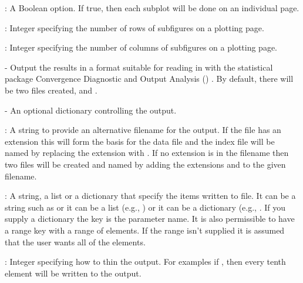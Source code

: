 \documentclass[article]{jss}
\begin{document}
\begin{description}
\begin{description}
\begin{description}
\begin{description}
    \item {}: A Boolean option. If true, then each
      subplot will be done on an individual page.
    \item {}: Integer specifying the number of rows of
      subfigures on a plotting page.
    \item {}: Integer specifying the number of columns of
      subfigures on a plotting page.
    \end{description}
  \end{description}

\item {} - Output the results in a format
  suitable for reading in with the statistical package Convergence
  Diagnostic and Output Analysis ()
  \citep{Rnews:Plummer+Best+Cowles+Vines:2006}. By default, there will
  be two files created,  and .

    \begin{description}
    \item {} - An optional dictionary controlling the
       output.

      \begin{description}
      \item {}: A string to provide an alternative
        filename for the output.  If the file has an extension this
        will form the basis for the data file and the index file will
        be named by replacing the extension with . If no
        extension is in the filename then two files will be created
        and named by adding the extensions  and 
        to the given filename.
      \item {}: A string, a list or a dictionary that
        specify the items written to file. It can be a string such as
         or it can be a list (e.g.,
        ) or it can be a dictionary (e.g., \newline
        .  If you supply a
        dictionary the key is the parameter name. It is also
        permissible to have a range key with a range of elements. If
        the range isn't supplied it is assumed that the user wants all
        of the elements.
      \item {}: Integer specifying how to thin the output.
        For examples if , then every tenth element
        will be written to the  output.
      \end{description}
    \end{description}
  \end{description}
\end{description}
\end{document}
